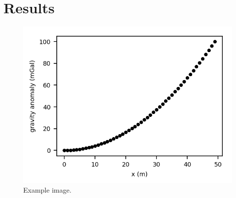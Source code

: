 \section{Results}

\lipsum[5]

\begin{figure}
    \centering
    \includegraphics[]{../figures/summary}
    \caption{
        Example image.
    }
    \label{fig:meh}
\end{figure}
